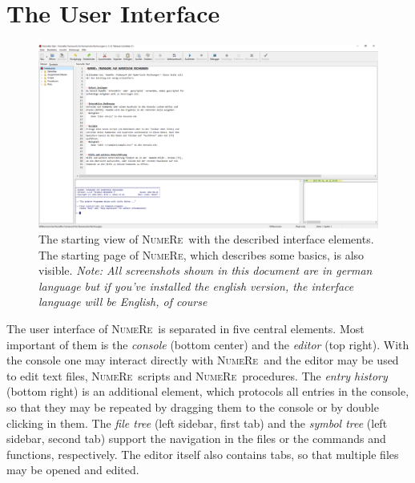 \documentclass[DIV=14,headsepline,footsepline]{scrbook}
\newcommand{\NR}{\textsc{Nu\-me\-Re}}
\begin{document}
			\section{The User Interface}
				\begin{figure}[htb]%
					\centering
					\includegraphics[width=\textwidth]{_graphics/ui.png}
					\caption{The starting view of \NR\ with the described interface elements. The starting page of \NR, which describes some basics, is also visible. \emph{Note: All screenshots shown in this document are in german language but if you've installed the english version, the interface language will be English, of course}}
					\label{fig:ui}
				\end{figure}
				The user interface of \NR\ is separated in five central elements. Most important of them is the \emph{console} (bottom center) and the \emph{editor} (top right). With the console one may interact directly with \NR\ and the editor may be used to edit text files, \NR\ scripts and \NR\ procedures. The \emph{entry history} (bottom right) is an additional element, which protocols all entries in the console, so that they may be repeated by dragging them to the console or by double clicking in them. The \emph{file tree} (left sidebar, first tab) and the \emph{symbol tree} (left sidebar, second tab) support the navigation in the files or the commands and functions, respectively. The editor itself also contains tabs, so that multiple files may be opened and edited.
				
\end{document}
